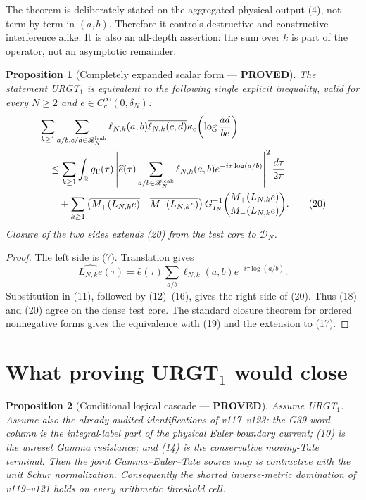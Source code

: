 \documentclass[11pt]{article}
\newcommand{\PROVED}{\textcolor{green!40!black}{\textbf{PROVED}}}
\newtheorem{proposition}{Proposition}
\begin{document}
The theorem is deliberately stated on the aggregated physical output
(4), not term by term in $(a,b)$.  Therefore it controls destructive and
constructive interference alike.  It is also an all-depth assertion: the
sum over $k$ is part of the operator, not an asymptotic remainder.

\begin{proposition}[Completely expanded scalar form --- \PROVED]
The statement URGT$_1$ is equivalent to the following single explicit
inequality, valid for every $N\ge2$ and
$e\in C_c^\infty(0,\delta_N)$:
\begin{align}
 &\sum_{k\ge1}
 \sum_{a/b,c/d\in\mathscr R_N^{\rm leak}}
 \ell_{N,k}(a,b)\overline{\ell_{N,k}(c,d)}
 \kappa_e\!\left(\log\frac{ad}{bc}\right)                \notag\\
 &\quad\le
 \sum_{k\ge1}\int_{\mathbb R}g_\Gamma(\tau)
     \left|
       \widehat e(\tau)
       \sum_{a/b\in\mathscr R_N^{\rm leak}}
          \ell_{N,k}(a,b)e^{-i\tau\log(a/b)}
     \right|^2\frac{d\tau}{2\pi}                         \notag\\
 &\qquad+
 \sum_{k\ge1}
 \begin{pmatrix}\overline{M_+(L_{N,k}e)}&
                 \overline{M_-(L_{N,k}e)}\end{pmatrix}
 G_{I_N}^{-1}
 \binom{M_+(L_{N,k}e)}{M_-(L_{N,k}e)}.                    \tag{20}
\end{align}
Closure of the two sides extends (20) from the test core to
$\mathscr D_N$.
\end{proposition}

\begin{proof}
The left side is (7).  Translation gives
\[
 \widehat{L_{N,k}e}(\tau)
 =\widehat e(\tau)
   \sum_{a/b}\ell_{N,k}(a,b)e^{-i\tau\log(a/b)}.
\]
Substitution in (11), followed by (12)--(16), gives the right side of
(20).  Thus (18) and (20) agree on the dense test core.  The standard
closure theorem for ordered nonnegative forms gives the equivalence with
(19) and the extension to (17).
\end{proof}

\section{What proving URGT$_1$ would close}

\begin{proposition}[Conditional logical cascade --- \PROVED]
Assume URGT$_1$.  Assume also the already audited identifications of
v117--v123: the G39 word column is the integral-label part of the physical
Euler boundary current; (10) is the unreset Gamma resistance; and (14) is
the conservative moving-Tate terminal.  Then the joint
Gamma--Euler--Tate source map is contractive with the unit Schur
normalization.  Consequently the shorted inverse-metric domination of
v119--v121 holds on every arithmetic threshold cell.
\end{proposition}
\end{document}
